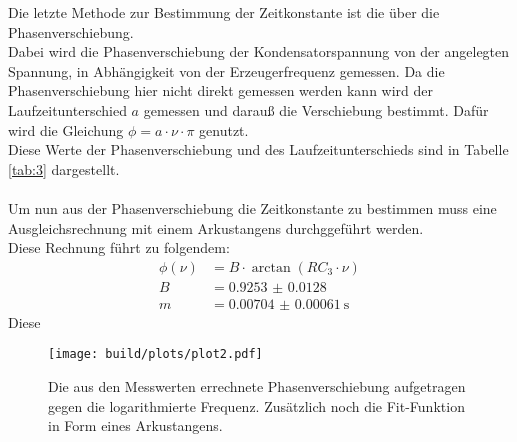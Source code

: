 \noindent Die letzte Methode zur Bestimmung der Zeitkonstante ist die über die Phasenverschiebung.\\ 
Dabei wird die Phasenverschiebung der Kondensatorspannung von der angelegten Spannung, in Abhängigkeit von der Erzeugerfrequenz gemessen.
Da die Phasenverschiebung hier nicht direkt gemessen werden kann wird der Laufzeitunterschied $a$ gemessen und darauß die Verschiebung bestimmt.
Dafür wird die Gleichung $\phi= a\cdot\nu\cdot\pi$ genutzt.\\
Diese Werte der Phasenverschiebung und des Laufzeitunterschieds sind in Tabelle \ref{tab:3} dargestellt.\\\\
\noindent Um nun aus der Phasenverschiebung die Zeitkonstante zu bestimmen muss eine Ausgleichsrechnung mit einem Arkustangens durchggeführt werden.\\
Diese Rechnung führt zu folgendem:
\begin{align*}
    \phi(\nu)&=B\cdot \arctan(RC_3 \cdot \nu)\\
    B&=\SI{0.9253(128)}{}\\
    m&=\SI{0.00704(61)}{\second}
\end{align*}
Diese 

\begin{figure}[H]
    \centering
    \texttt{[image: build/plots/plot2.pdf]}
    \caption{Die aus den Messwerten errechnete Phasenverschiebung aufgetragen gegen die logarithmierte Frequenz. Zusätzlich noch die Fit-Funktion in Form eines Arkustangens. }
    \label{img:3}
\end{figure}

